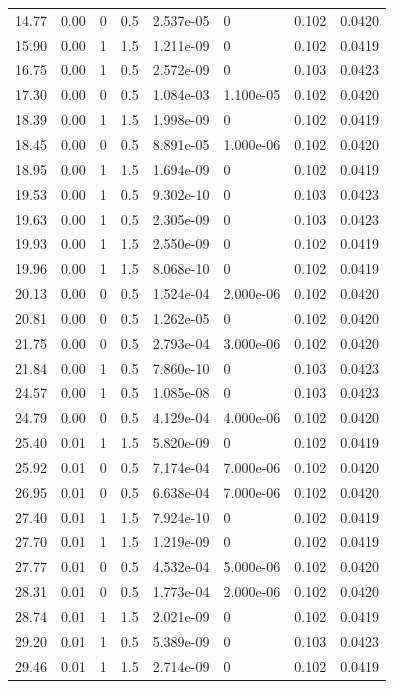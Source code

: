\documentclass[preview]{standalone}
\begin{document}
{{\begin{tabular}{L{1.2cm}C{1.2cm} C{0.3cm}C{0.5cm} C{1.4cm}C{1.4cm} C{1.4cm}C{1.4cm}}
  14.77  &  0.00  & 0     & 0.5 &  2.537e-05  & 0  & 0.102 &  0.0420   \\ 
  15.90  &  0.00  & 1     & 1.5 &  1.211e-09  & 0  & 0.102 &  0.0419   \\ 
  16.75  &  0.00  & 1     & 0.5 &  2.572e-09  & 0  & 0.103 &  0.0423   \\ 
  17.30  &  0.00  & 0     & 0.5 &  1.084e-03  & 1.100e-05  & 0.102 &  0.0420   \\ 
  18.39  &  0.00  & 1     & 1.5 &  1.998e-09  & 0  & 0.102 &  0.0419   \\ 
  18.45  &  0.00  & 0     & 0.5 &  8.891e-05  & 1.000e-06  & 0.102 &  0.0420   \\ 
  18.95  &  0.00  & 1     & 1.5 &  1.694e-09  & 0  & 0.102 &  0.0419   \\ 
  19.53  &  0.00  & 1     & 0.5 &  9.302e-10  & 0  & 0.103 &  0.0423   \\ 
  19.63  &  0.00  & 1     & 0.5 &  2.305e-09  & 0  & 0.103 &  0.0423   \\ 
  19.93  &  0.00  & 1     & 1.5 &  2.550e-09  & 0  & 0.102 &  0.0419   \\ 
  19.96  &  0.00  & 1     & 1.5 &  8.068e-10  & 0  & 0.102 &  0.0419   \\ 
  20.13  &  0.00  & 0     & 0.5 &  1.524e-04  & 2.000e-06  & 0.102 &  0.0420   \\ 
  20.81  &  0.00  & 0     & 0.5 &  1.262e-05  & 0  & 0.102 &  0.0420   \\ 
  21.75  &  0.00  & 0     & 0.5 &  2.793e-04  & 3.000e-06  & 0.102 &  0.0420   \\ 
  21.84  &  0.00  & 1     & 0.5 &  7.860e-10  & 0  & 0.103 &  0.0423   \\ 
  24.57  &  0.00  & 1     & 0.5 &  1.085e-08  & 0  & 0.103 &  0.0423   \\ 
  24.79  &  0.00  & 0     & 0.5 &  4.129e-04  & 4.000e-06  & 0.102 &  0.0420   \\ 
  25.40  &  0.01  & 1     & 1.5 &  5.820e-09  & 0  & 0.102 &  0.0419   \\ 
  25.92  &  0.01  & 0     & 0.5 &  7.174e-04  & 7.000e-06  & 0.102 &  0.0420   \\ 
  26.95  &  0.01  & 0     & 0.5 &  6.638e-04  & 7.000e-06  & 0.102 &  0.0420   \\ 
  27.40  &  0.01  & 1     & 1.5 &  7.924e-10  & 0  & 0.102 &  0.0419   \\ 
  27.70  &  0.01  & 1     & 1.5 &  1.219e-09  & 0  & 0.102 &  0.0419   \\ 
  27.77  &  0.01  & 0     & 0.5 &  4.532e-04  & 5.000e-06  & 0.102 &  0.0420   \\ 
  28.31  &  0.01  & 0     & 0.5 &  1.773e-04  & 2.000e-06  & 0.102 &  0.0420   \\ 
  28.74  &  0.01  & 1     & 1.5 &  2.021e-09  & 0  & 0.102 &  0.0419   \\ 
  29.20  &  0.01  & 1     & 0.5 &  5.389e-09  & 0  & 0.103 &  0.0423   \\ 
  29.46  &  0.01  & 1     & 1.5 &  2.714e-09  & 0  & 0.102 &  0.0419   \\ 
\hline 
\end{tabular} 

}}
\end{document}
